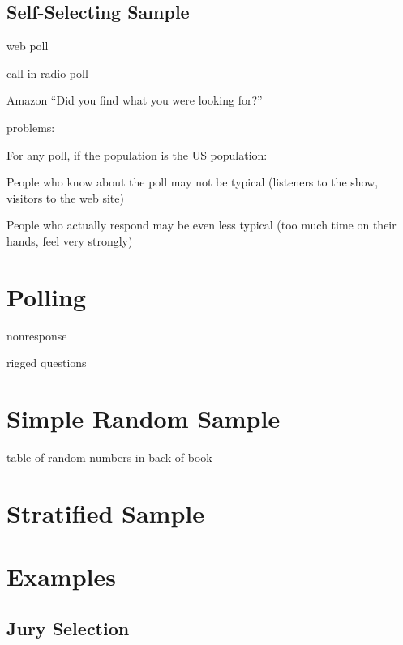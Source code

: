 \documentclass[landscape]{exam}
\begin{document}
  \subsection{Self-Selecting Sample}
  \begin{itemize*}
    \item web poll
    \item call in radio poll
    \item Amazon ``Did you find what you were looking for?''
  \end{itemize*}

  problems:

  For any poll, if the population is the US population:
  \begin{itemize*}
    \item People who know about the poll may not be typical (listeners to the
      show, visitors to the web site)
    \item People who actually respond may be even less typical (too much time on
      their hands, feel very strongly)
  \end{itemize*}

  \section{Polling}
  \begin{itemize*}
    \item nonresponse
    \item rigged questions
  \end{itemize*}

  \section{Simple Random Sample}
  \begin{itemize*}
    \item table of random numbers in back of book
  \end{itemize*}

  \section{Stratified Sample}

  \section{Examples}

  \subsection{Jury Selection}
\end{document}
